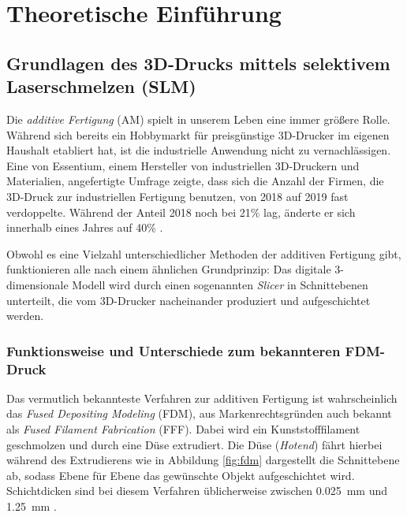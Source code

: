 \chapter{Theoretische Einführung}



\section{Grundlagen des 3D-Drucks mittels selektivem Laserschmelzen (SLM)}
	Die \emph{additive Fertigung} (AM) spielt in unserem Leben eine immer größere Rolle. Während
	sich bereits ein Hobbymarkt für preisgünstige 3D-Drucker im eigenen Haushalt etabliert hat,
	ist die industrielle Anwendung nicht zu vernachlässigen. Eine von Essentium, einem Hersteller
	von industriellen 3D-Druckern und Materialien, angefertigte Umfrage zeigte, dass sich die
	Anzahl der Firmen, die 3D-Druck zur industriellen Fertigung benutzen, von 2018 auf 2019 fast
	verdoppelte. Während der Anteil 2018 noch bei 21\% lag, änderte er sich innerhalb eines Jahres
	auf 40\% \cite{stevenson2019survey}.

	Obwohl es eine Vielzahl unterschiedlicher Methoden der additiven Fertigung gibt, funktionieren
	alle nach einem ähnlichen Grundprinzip: Das digitale 3-dimension\-ale Modell wird durch einen
	sogenannten \emph{Slicer} in Schnittebenen unterteilt, die vom 3D-Drucker nacheinander
	produziert und aufgeschichtet werden.

	\subsection{Funktionsweise und Unterschiede zum bekannteren FDM-Druck}
		Das vermutlich bekannteste Verfahren zur additiven Fertigung ist wahrscheinlich das
		\emph{Fused Depositing Modeling} (FDM), aus Markenrechtsgründen auch bekannt als
		\emph{Fused Filament Fabrication} (FFF). Dabei wird ein Kunststofffilament geschmolzen
		und durch eine Düse extrudiert. Die Düse (\emph{Hotend}) fährt hierbei während des
		Extrudierens wie in Abbildung \ref{fig:fdm} dargestellt die Schnittebene ab, sodass
		Ebene für Ebene das gewünschte Objekt aufgeschichtet wird. Schichtdicken sind bei diesem
		Verfahren üblicherweise zwischen \SI{0,025}{\milli\meter} und \SI{1,25}{\milli\meter}
		\cite{wikipedia2021fused}.

